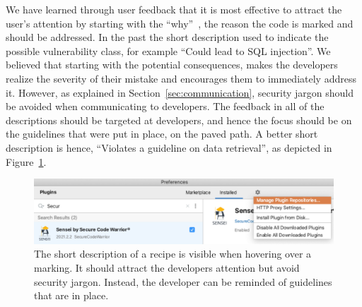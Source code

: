 We have learned through user feedback that it is most effective to attract the user's attention by starting with the “why”~\cite{RSAvideo}, the reason the code is marked and should be addressed.
In the past the short description used to indicate the possible vulnerability class, for example “Could lead to SQL injection”. 
We believed that starting with the potential consequences, makes the developers realize the severity of their mistake and encourages them to immediately address it.
However, as explained in Section~\ref{sec:communication}, security jargon should be avoided when communicating to developers.
The feedback in all of the descriptions should be targeted at developers, and hence the focus should be on the guidelines that were put in place, on the paved path.
A better short description is hence, “Violates a guideline on data retrieval”, as depicted in Figure~\ref{fig:shortdescription}.

\begin{figure}
  \centering
  \includegraphics[width=\textwidth,page=14]{04-tools/figures/figures2.pdf}
  \caption[Short description of a recipe]{The short description of a recipe is visible when hovering over a marking. It should attract the developers attention but avoid security jargon. Instead, the developer can be reminded of guidelines that are in place.}
  \label{fig:shortdescription} 
\end{figure}

